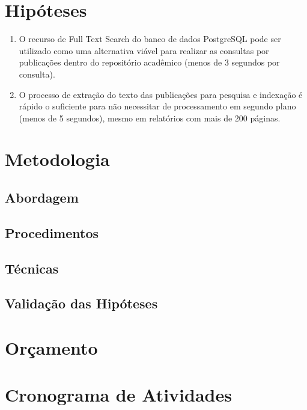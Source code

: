 \section{Hipóteses} \label{sec::Hypothesis}
\begin{enumerate}
    \item O recurso de Full Text Search do banco de dados PostgreSQL pode ser utilizado como uma alternativa viável para realizar as consultas por publicações dentro do repositório acadêmico (menos de 3 segundos por consulta).
    \item O processo de extração do texto das publicações para pesquisa e indexação é rápido o suficiente para não necessitar de processamento em segundo plano (menos de 5 segundos), mesmo em relatórios com mais de 200 páginas.
\end{enumerate}


\section{Metodologia} \label{sec:Methodology}

\subsection{Abordagem}

\subsection{Procedimentos}

\subsection{Técnicas}

\subsection{Validação das Hipóteses}


\section{Orçamento} \label{sec:budget}


\section{Cronograma de Atividades} \label{sec:schedule_activities_table}

